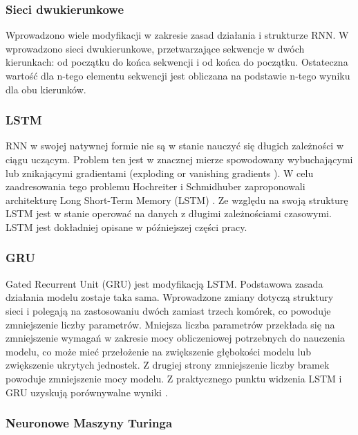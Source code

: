 \documentclass[oneside, mag]{mgr}
\begin{document}
\subsubsection{Sieci dwukierunkowe}

Wprowadzono wiele modyfikacji w zakresie zasad działania i strukturze RNN. 
W \cite{bidirectional} wprowadzono sieci dwukierunkowe, przetwarzające sekwencje w dwóch kierunkach: od początku do końca sekwencji i od końca do początku. Ostateczna wartość dla n-tego elementu sekwencji jest obliczana na podstawie n-tego wyniku dla obu kierunków.

\subsubsection{LSTM}

RNN w swojej natywnej formie nie są w stanie nauczyć się długich zależności w ciągu uczącym. Problem ten jest w znacznej mierze spowodowany wybuchającymi lub znikającymi gradientami (exploding or vanishing gradients \cite{vanishing_gradient_RNN}). W celu zaadresowania tego problemu Hochreiter i Schmidhuber zaproponowali architekturę Long Short-Term Memory (LSTM) \cite{LSTM}. Ze względu na swoją strukturę LSTM jest w stanie operować na danych z długimi zależnościami czasowymi. LSTM jest dokładniej opisane w późniejszej części pracy. 

\subsubsection{GRU}

Gated Recurrent Unit (GRU) \cite{DBLP:journals/corr/ChungGCB15} jest modyfikacją LSTM. Podstawowa zasada działania modelu zostaje taka sama. Wprowadzone zmiany dotyczą struktury sieci i polegają na zastosowaniu dwóch zamiast trzech komórek, co powoduje zmniejszenie liczby parametrów. Mniejsza liczba parametrów przekłada się na zmniejszenie wymagań w zakresie mocy obliczeniowej potrzebnych do nauczenia modelu, co może mieć przełożenie na zwiększenie głębokości modelu lub zwiększenie ukrytych jednostek. Z drugiej strony zmniejszenie liczby bramek powoduje zmniejszenie mocy modelu. Z praktycznego punktu widzenia LSTM i GRU uzyskują porównywalne wyniki \cite{DBLP:journals/corr/ChungGCB14}.

\subsubsection{Neuronowe Maszyny Turinga}
\end{document}
